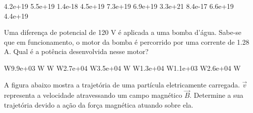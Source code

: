 \documentclass[12pt, addpoints]{exam}
\begin{document}
\begin{questions}
\begin{multicols*}{2}
\begin{oneparchoices}
\choice 4.2e+19 \choice 5.5e+19 \choice 1.4e-18 \choice 4.5e+19 \choice 7.3e+19 \choice 6.9e+19 \choice 3.3e+21 \choice 8.4e-17 \choice 6.6e+19 \choice 4.4e+19 
\end{oneparchoices}\question Uma diferença de potencial de 120 V é aplicada a uma bomba d’água. Sabe-se que em funcionamento, o motor da bomba é percorrido por uma corrente de    1.28 A. Qual é a potência desenvolvida nesse motor?

\begin{oneparchoices}
 W\choice 9.9e+03 W W W\choice 2.7e+04 W\choice 3.5e+04 W W\choice 1.3e+04 W\choice 1.1e+03 W\choice 2.6e+04 W
\end{oneparchoices}\question A ﬁgura abaixo mostra a trajetória de uma partícula eletricamente carregada. $\vec{{v}}$ representa a velocidade atravessando um campo magnético $\vec{{B}}$. Determine a sua trajetória devido a ação da força magnética atuando sobre ela.
        
        \begin{center}
            \begin{minipage}[c]{0.5\linewidth}
            \end{minipage}
        \end{center}

        


\end{multicols*}
\end{questions}
\end{document}
